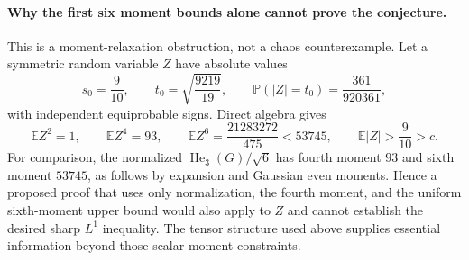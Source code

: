 \documentclass[11pt]{article}
\newcommand{\E}{\mathbb E}
\newcommand{\He}{\operatorname{He}}
\begin{document}
\paragraph{Why the first six moment bounds alone cannot prove the conjecture.}
This is a moment-relaxation obstruction, not a chaos counterexample.
Let a symmetric random variable $Z$ have absolute values
\[
 s_0=\frac9{10},\qquad t_0=\sqrt{\frac{9219}{19}},
 \qquad \mathbb P(|Z|=t_0)=\frac{361}{920361},
\]
with independent equiprobable signs. Direct algebra gives
\[
 \E Z^2=1,\qquad\E Z^4=93,\qquad
 \E Z^6=\frac{21283272}{475}<53745,
 \qquad\E|Z|>\frac9{10}>c.
\]
For comparison, the normalized $\He_3(G)/\sqrt6$ has fourth moment $93$
and sixth moment $53745$, as follows by expansion and Gaussian even moments.
Hence a proposed proof that uses only normalization, the fourth moment, and
the uniform sixth-moment upper bound would also apply to $Z$ and cannot
establish the desired sharp $L^1$ inequality. The tensor structure used
above supplies essential information beyond those scalar moment constraints.
\end{document}
